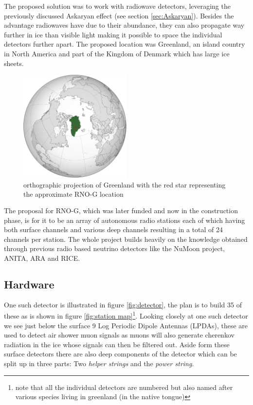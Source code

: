 \documentclass[11pt,a4paper,faculty=we,language=en,doctype=report]{cls/ugent-doc}
\begin{document}
The proposed solution was to work with radiowave detectors, leveraging the
previously discussed Askaryan effect (see section \ref{sec:Askaryan}).  Besides
the advantage radiowaves have due to their abundance, they can also propagate
way further in ice than visible light making it possible to space the
individual detectors further apart. The proposed location was Greenland, an
island country in North America and part of the Kingdom of Denmark which has
large ice sheets.
\begin{figure}
  \centering
  \includegraphics[width=0.5\textwidth]{figures/GreenlandOP.pdf}
  \caption{orthographic projection of Greenland with the red star representing the approximate RNO-G location}
  \label{fig:GreenlandOP}
\end{figure}
The proposal for RNO-G, which was later funded and now in the construction
phase, is for it to be an array of autonomous radio stations each of which having both
surface channels and various deep channels resulting in a total of 24 channels
per station. The whole project builds heavily on the knowledge obtained through
previous radio based neutrino detectors like the NuMoon\cite{numoon} project,
ANITA\cite{ANITA}, ARA\cite{ARA} and RICE\cite{RICE}.
\subsection{Hardware}
One such detector is illustrated in figure \ref{fig:detector}, the plan is to
build 35 of these as is shown in figure \ref{fig:station map}\footnote{note
that all the individual detectors are numbered but also named after various species living in
greenland (in the native tongue)}. Looking closely at one such detector we see
just below the surface 9 Log Periodic Dipole Antennas (LPDAs), these are used
to detect air shower muon signals as muons will also generate cherenkov
radiation in the ice whose signals can then be filtered out.  Aside form these
surface detectors there are also deep components of the detector which can be
split up in three parts: Two \textit{helper strings} and the \textit{power
string}.
\end{document}
